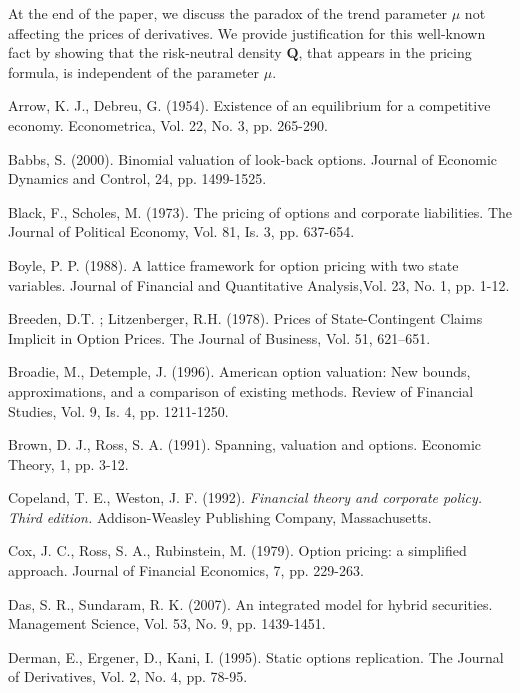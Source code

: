 \documentclass{amsart}
\theoremstyle{definition}
\theoremstyle{remark}
\numberwithin{equation}{section}
\newcommand{\1}{\boldsymbol{1}}
\begin{document}
At the end of the paper, we discuss the paradox of the trend parameter $\mu$ not affecting the prices of derivatives. We provide justification for this well-known fact by showing that the risk-neutral density $\mathbf{Q}$, that appears in the pricing formula, is independent of the parameter $\mu$.





\begin{thebibliography}{DGZ}

 Arrow, K. J., Debreu, G. (1954). Existence of an equilibrium for a competitive economy. Econometrica, Vol. 22, No. 3, pp. 265-290.

 Babbs, S. (2000). Binomial valuation of look-back options. Journal of Economic Dynamics and Control, 24, pp. 1499-1525.

 Black, F., Scholes, M. (1973). The pricing of options and corporate liabilities. The Journal of Political Economy, Vol. 81, Is. 3, pp. 637-654.

 Boyle, P. P. (1988). A lattice framework for option pricing with two state variables. Journal of Financial and Quantitative Analysis,Vol. 23, No. 1, pp. 1-12.

 Breeden, D.T. ; Litzenberger, R.H. (1978). Prices of State-Contingent Claims Implicit in Option Prices. 
The Journal of Business, Vol. 51, 621--651.

 Broadie, M., Detemple, J. (1996). American option valuation: New bounds, approximations, and a comparison of existing methods. Review of Financial Studies, Vol. 9, Is. 4, pp. 1211-1250.

 Brown, D. J., Ross, S. A. (1991).  Spanning, valuation and options. Economic Theory, 1, pp. 3-12.

 Copeland, T. E., Weston, J. F. (1992). \emph{Financial theory and corporate policy. Third edition.} Addison-Weasley Publishing Company, Massachusetts.

 Cox, J. C., Ross, S. A., Rubinstein, M. (1979). Option pricing: a simplified approach. Journal of Financial Economics, 7, pp. 229-263.

 Das, S. R., Sundaram, R. K. (2007). An integrated model for hybrid securities. Management Science, Vol. 53, No. 9, pp. 1439-1451.

 Derman, E., Ergener, D., Kani, I. (1995). Static options replication. The Journal of Derivatives, Vol. 2, No. 4, pp. 78-95.


\end{thebibliography}
\end{document}
